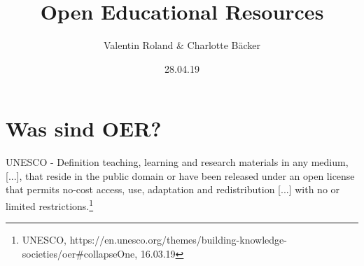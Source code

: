 \documentclass[14pt]{beamer}
\title{Open Educational Resources}
\subtitle{}
\author{Valentin Roland \& Charlotte Bäcker}
\date{28.04.19}
\makeatletter
\def\blfootnote{\gdef\@thefnmark{}\@footnotetext}
\makeatother
\begin{document}
\maketitle

\section{Was sind \glqq OER\grqq?}

{
    \begin{frame}{}
        \vspace{-.1cm}

        \blfootnote{\vspace{-.7cm}\textcolor{white}{OER Global Logo by Jonathas Mello (CC BY 3.0).}}
    \end{frame}
}

\begin{frame}{UNESCO - Definition}
    \glqq \alert{teaching, learning and research materials} in any medium, [...], that reside in the \alert{public domain} or have been released under an \alert{open license} that permits \alert{no-cost access, use, adaptation and redistribution} [...] with no or limited restrictions.\grqq \footnote{UNESCO, \tiny{https://en.unesco.org/themes/building-knowledge-societies/oer\#collapseOne, 16.03.19}}%

\end{frame}
\end{document}

